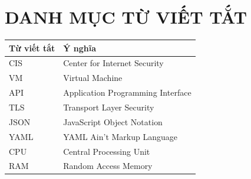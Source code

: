 \section*{DANH MỤC TỪ VIẾT TẮT}
\label{danh-muc-tu-viet-tat}

{\def\LTcaptype{none}
\begin{longtable}[]{@{}|
  >{\raggedright\arraybackslash}p{}|
  >{\raggedright\arraybackslash}p{}|@{}}
\hline
\textbf{Từ viết tắt} & \textbf{Ý nghĩa} \\
\hline
\endhead
CIS & Center for Internet Security \\
\hline
VM & Virtual Machine \\
\hline
API & Application Programming Interface \\
\hline
TLS & Transport Layer Security \\
\hline
JSON & JavaScript Object Notation \\
\hline
YAML & YAML Ain't Markup Language \\
\hline
CPU & Central Processing Unit \\
\hline
RAM & Random Access Memory \\
\hline
\end{longtable}
}
